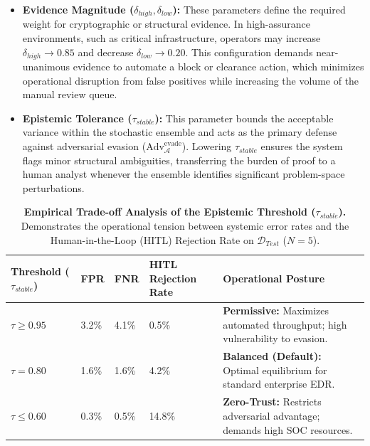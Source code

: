 \documentclass[pdflatex,sn-mathphys-num]{sn-jnl}
\begin{document}
\begin{itemize}
    \item \textbf{Evidence Magnitude ($\delta_{high}, \delta_{low}$):} These parameters define the required weight for cryptographic or structural evidence. In high-assurance environments, such as critical infrastructure, operators may increase $\delta_{high} \rightarrow 0.85$ and decrease $\delta_{low} \rightarrow 0.20$. This configuration demands near-unanimous evidence to automate a block or clearance action, which minimizes operational disruption from false positives while increasing the volume of the manual review queue.
    \item \textbf{Epistemic Tolerance ($\tau_{stable}$):} This parameter bounds the acceptable variance within the stochastic ensemble and acts as the primary defense against adversarial evasion ($\text{Adv}_{\mathcal{A}}^{\text{evade}}$). Lowering $\tau_{stable}$ ensures the system flags minor structural ambiguities, transferring the burden of proof to a human analyst whenever the ensemble identifies significant problem-space perturbations.
\end{itemize}


\begin{table}[h]
\centering
\caption{\textbf{Empirical Trade-off Analysis of the Epistemic Threshold ($\tau_{stable}$).} Demonstrates the operational tension between systemic error rates and the Human-in-the-Loop (HITL) Rejection Rate on $\mathcal{D}_{Test}$ ($N=5$).}
\label{tab:threshold_tuning}
\begin{tabular}{p{}|p{}p{}|p{}| p{}}
\toprule
\textbf{Threshold ($\tau_{stable}$)} & \textbf{FPR} & \textbf{FNR} & \textbf{HITL Rejection Rate} & \textbf{Operational Posture} \\
\midrule
$\tau \geq 0.95$ & 3.2\% & 4.1\% & 0.5\% & \textbf{Permissive:} Maximizes automated throughput; high vulnerability to evasion. \\
\midrule
$\tau = 0.80$ & 1.6\% & 1.6\% & 4.2\% & \textbf{Balanced (Default):} Optimal equilibrium for standard enterprise EDR. \\
\midrule
$\tau \leq 0.60$ & 0.3\% & 0.5\% & 14.8\% & \textbf{Zero-Trust:} Restricts adversarial advantage; demands high SOC resources. \\
\bottomrule
\end{tabular}%
\end{table}
\end{document}
